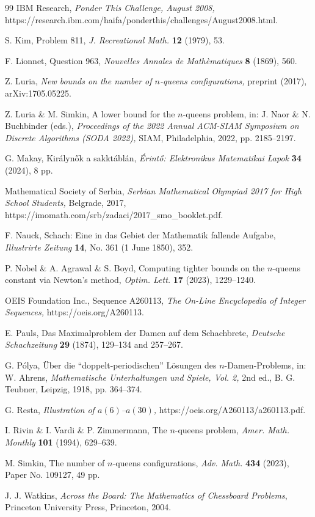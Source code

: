 \documentclass[10pt,a4paper]{article}
\theoremstyle{definition}
\begin{document}
\begin{thebibliography}{99}
IBM Research, \emph{Ponder This Challenge, August 2008,}
https://research.ibm.com/haifa/ponderthis/challenges/August2008.html.

S. Kim, Problem 811, \emph{J. Recreational Math.} \textbf{12} (1979), 53.

F. Lionnet, Question 963, \emph{Nouvelles Annales de Math\`ematiques} \textbf{8} (1869), 560.

Z. Luria, \emph{New bounds on the number of $n$-queens configurations,}
preprint (2017), arXiv:1705.05225.

Z. Luria \& M. Simkin, A lower bound for the $n$-queens problem, in: J. Naor \& N. Buchbinder (eds.), \emph{Proceedings of the 2022 Annual ACM-SIAM Symposium on Discrete Algorithms
(SODA 2022),} SIAM, Philadelphia, 2022, pp. 2185--2197.

G. Makay, Kir\'alyn\H ok a sakkt\'abl\'an, \emph{\'Erint\H o: Elektronikus
Matematikai Lapok} \textbf{34} (2024), 8 pp.


Mathematical Society of Serbia, \emph{Serbian Mathematical Olympiad 2017 for High School
Students,} Belgrade, 2017,
https://imomath.com/srb/zadaci/2017\_smo\_booklet.pdf.

F. Nauck, Schach: Eine in das Gebiet der Mathematik fallende Aufgabe, \emph{Illustrirte Zeitung} \textbf{14},
No. 361 (1 June 1850), 352.

P. Nobel \& A. Agrawal \& S. Boyd, Computing tighter bounds on the $n$-queens
constant via Newton's method, \emph{Optim. Lett.} \textbf{17} (2023),
1229--1240.

OEIS Foundation Inc., Sequence A260113, \emph{The On-Line Encyclopedia of
Integer Sequences,} https://oeis.org/A260113.

E. Pauls, Das Maximalproblem der Damen auf dem Schachbrete, \emph{Deutsche
Schachzeitung} \textbf{29} (1874), 129--134 and 257--267.

G. P\'olya, \"Uber die ``doppelt-periodischen'' L\"osungen des
$n$-Damen-Problems, in: W. Ahrens, \emph{Mathematische Unterhaltungen und
Spiele, Vol. 2,} 2nd ed., B. G. Teubner, Leipzig, 1918, pp. 364--374.

G. Resta, \emph{Illustration of $a(6)$--$a(30)$,}
https://oeis.org/A260113/a260113.pdf.

I. Rivin \& I. Vardi \& P. Zimmermann, The $n$-queens problem, \emph{Amer.
Math. Monthly} \textbf{101} (1994), 629--639.

M. Simkin, The number of $n$-queens configurations, \emph{Adv. Math.}
\textbf{434} (2023), Paper No. 109127, 49 pp.

J. J. Watkins, \emph{Across the Board: The Mathematics of Chessboard Problems},
Princeton University Press, Princeton, 2004.

\end{thebibliography}
\end{document}

